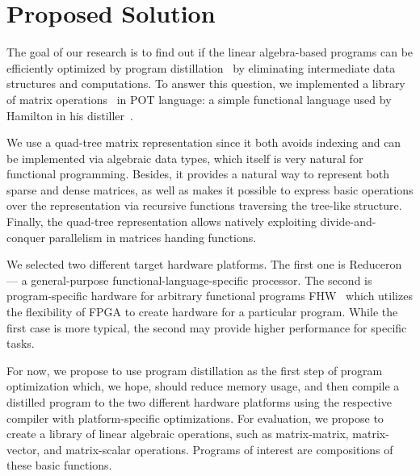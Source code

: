\section{Proposed Solution}

The goal of our research is to find out if the linear algebra-based programs can be efficiently optimized by program distillation~\cite{hamilton2021700} by eliminating intermediate data structures and computations.
To answer this question, we implemented a library of matrix operations~ in POT language: a simple functional language used by Hamilton in his distiller~.  

We use a quad-tree matrix representation since it both avoids indexing and can be implemented via algebraic data types, which itself is very natural for functional programming.
Besides, it provides a natural way to represent both sparse and dense matrices, as well as makes it possible to express basic operations over the representation via recursive functions traversing the tree-like structure.
Finally, the quad-tree representation allows natively exploiting divide-and-conquer parallelism in matrices handing functions.

We selected two different target hardware platforms.
The first one is Reduceron~\cite{naylorRunciman2012} --- a general-purpose functional-language-specific processor.
The second is program-specific hardware for arbitrary functional programs FHW~\cite{Edwards2019FHWP} which utilizes the flexibility of FPGA to create hardware for a particular program.
While the first case is more typical, the second may provide higher performance for specific tasks.

For now, we propose to use program distillation as the first step of program optimization which, we hope, should reduce memory %
usage, and then compile a distilled program to the two different hardware platforms using the respective compiler with platform-specific optimizations.
For evaluation, we propose  to create a library of linear algebraic operations, such as matrix-matrix, matrix-vector, and matrix-scalar operations.
Programs of interest are compositions of these basic functions.